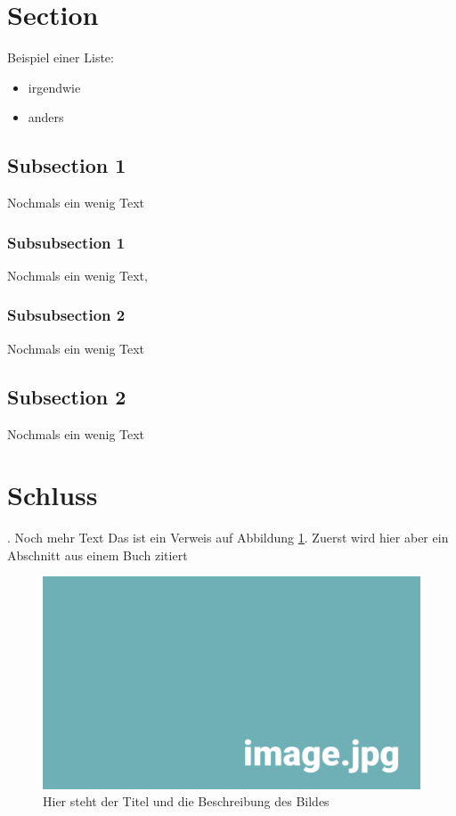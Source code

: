 
\section{Section}

Beispiel einer Liste:

\begin{itemize} 
	\item irgendwie 
	\item anders
\end{itemize}


\subsection{Subsection 1}
Nochmals ein wenig Text

\subsubsection{Subsubsection 1}
Nochmals ein wenig Text‚

\subsubsection{Subsubsection 2}
Nochmals ein wenig Text

\subsection{Subsection 2}
Nochmals ein wenig Text

\section{Schluss}.
Noch mehr Text
Das ist ein Verweis auf Abbildung \ref{pic:DasBild}. Zuerst wird hier aber ein Abschnitt aus einem Buch  zitiert\\

\begin{figure}[h!]
	\centering

	\includegraphics[width=\textwidth]{img/image.jpg}

	\caption[Hier steht der Titel des Bildes]{Hier steht der Titel und die Beschreibung des Bildes}
	\label{pic:DasBild}

\end{figure}
